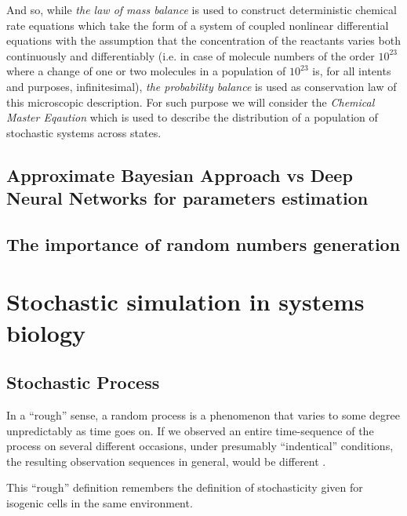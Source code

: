 \documentclass[12pt,a4paper]{report}
\begin{document}
And so, while \emph{the law of mass balance} is used to construct deterministic chemical rate equations which take the form of a system of coupled nonlinear differential equations with the assumption that the concentration of the reactants varies both continuously and differentiably (i.e. in case of molecule numbers of the order $10^{23}$ where a change of one or two molecules in a population of $10^{23}$ is, for all intents and purposes, infinitesimal), \emph{the probability balance} is used as conservation law of this microscopic description. For such purpose we will consider the \emph{Chemical Master Eqaution} which is used to describe the distribution of a population of stochastic systems across states.


\section{Approximate Bayesian Approach vs Deep Neural Networks for parameters estimation}

\section{The importance of random numbers generation}

\chapter{Stochastic simulation in systems biology}\label{Simulations}

\section{Stochastic Process}
In a ``rough'' sense, a random process is a phenomenon that varies to some degree unpredictably as time goes on. If we observed an entire time-sequence of the process on several different occasions, under presumably ``indentical'' conditions, the resulting observation sequences in general, would be different \cite{AssocProfThamer}. 

This ``rough'' definition remembers the definition of stochasticity given for isogenic cells in the same environment. 
\end{document}

